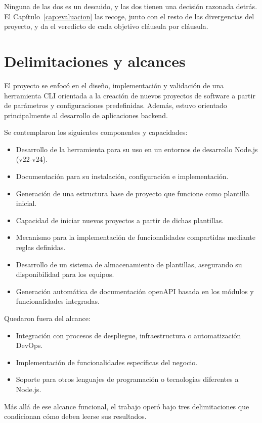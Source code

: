 Ninguna de las dos es un descuido, y las dos tienen una decisión razonada
detrás. El Capítulo~\ref{cap:evaluacion} las recoge, junto con el resto de
las divergencias del proyecto, y da el veredicto de cada objetivo cláusula
por cláusula.

\section{Delimitaciones y alcances}
\label{sec:delimitaciones-alcances}
El proyecto se enfocó en el diseño, implementación y validación de una herramienta CLI orientada a la creación de nuevos proyectos de software a partir de parámetros y configuraciones predefinidas. Además, estuvo orientado principalmente al desarrollo de aplicaciones backend.

Se contemplaron los siguientes componentes y capacidades:

\begin{itemize}
    \item Desarrollo de la herramienta para su uso en un entornos de desarrollo Node.js (v22-v24).
    \item Documentación para su instalación, configuración e implementación.
    \item Generación de una estructura base de proyecto que funcione como plantilla inicial.
    \item Capacidad de iniciar nuevos proyectos a partir de dichas plantillas.
    \item Mecanismo para la implementación de funcionalidades compartidas mediante reglas definidas.
    \item Desarrollo de un sistema de almacenamiento de plantillas, asegurando su disponibilidad para los equipos.
    \item Generación automática de documentación openAPI basada en los módulos y funcionalidades integradas.
\end{itemize}

Quedaron fuera del alcance:

\begin{itemize}
    \item Integración con procesos de despliegue, infraestructura o automatización DevOps.
    \item Implementación de funcionalidades específicas del negocio.
    \item Soporte para otros lenguajes de programación o tecnologías diferentes a Node.js.
\end{itemize}
Más allá de ese alcance funcional, el trabajo operó bajo tres delimitaciones
que condicionan cómo deben leerse sus resultados.

